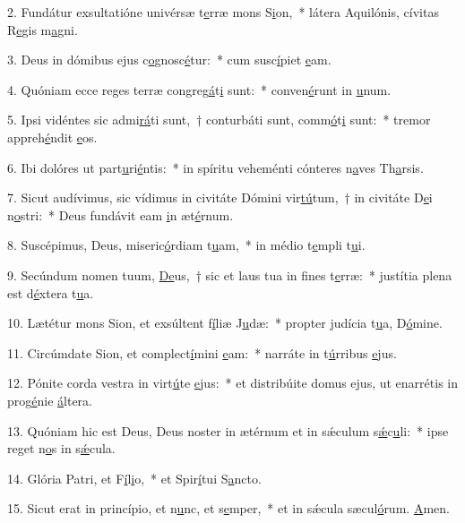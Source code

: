 2. Fundátur exsultatióne univérsæ t\uline{e}rræ mons S\uline{i}on,~* látera Aquilónis, cívitas R\uline{e}gis m\uline{a}gni.\par 
3. Deus in dómibus ejus c\uline{o}gnosc\uline{é}tur:~* cum susc\uline{í}piet \uline{e}am.\par 
4. Quóniam ecce reges terræ congreg\uline{á}t\uline{i} sunt:~* conven\uline{é}runt in \uline{u}num.\par 
5. Ipsi vidéntes sic admi\uline{rá}ti sunt,~† conturbáti sunt, comm\uline{ó}t\uline{i} sunt:~* tremor appreh\uline{é}ndit \uline{e}os.\par 
6. Ibi dolóres ut part\uline{u}ri\uline{é}ntis:~* in spíritu veheménti cónteres n\uline{a}ves Th\uline{a}rsis.\par 
7. Sicut audívimus, sic vídimus in civitáte Dómini vir\uline{tú}tum,~† in civitáte D\uline{e}i n\uline{o}stri:~* Deus fundávit eam \uline{i}n æt\uline{é}rnum.\par 
8. Suscépimus, Deus, miseric\uline{ó}rdiam t\uline{u}am,~* in médio t\uline{e}mpli t\uline{u}i.\par 
9. Secúndum nomen tuum, \uline{De}us,~† sic et laus tua in f\uline{i}nes t\uline{e}rræ:~* justítia plena est d\uline{é}xtera t\uline{u}a.\par 
10. Lætétur mons Sion, et exsúltent f\uline{í}liæ J\uline{u}dæ:~* propter judícia t\uline{u}a, D\uline{ó}mine.\par 
11. Circúmdate Sion, et complect\uline{í}mini \uline{e}am:~* narráte in t\uline{ú}rribus \uline{e}jus.\par 
12. Pónite corda vestra in virt\uline{ú}te \uline{e}jus:~* et distribúite domus ejus, ut enarrétis in prog\uline{é}nie \uline{á}ltera.\par 
13. Quóniam hic est Deus, Deus noster in ætérnum et in sǽculum s\uline{ǽ}c\uline{u}li:~* ipse reget n\uline{o}s in s\uline{ǽ}cula.\par 
14. Glória Patri, et F\uline{í}l\uline{i}o,~* et Spir\uline{í}tui S\uline{a}ncto.\par 
15. Sicut erat in princípio, et n\uline{u}nc, et s\uline{e}mper,~* et in sǽcula sæcul\uline{ó}rum. \uline{A}men.\par 
